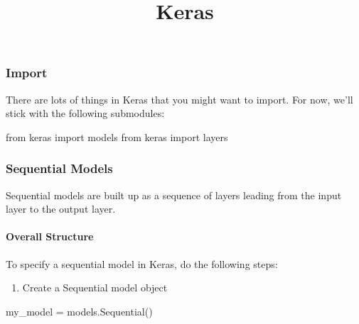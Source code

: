 \documentclass[]{extarticle}
\title{Keras}
\author{}
\date{}
\newenvironment{Shaded}{\begin{snugshade}}{\end{snugshade}}
\newcommand{\ImportTok}[1]{\textcolor[rgb]{0.80,0.80,0.80}{#1}}
\newcommand{\NormalTok}[1]{\textcolor[rgb]{0.80,0.80,0.80}{#1}}
\newcommand{\OperatorTok}[1]{\textcolor[rgb]{0.94,0.94,0.82}{#1}}
\providecommand{\tightlist}{%
  \setlength{\itemsep}{0pt}\setlength{\parskip}{0pt}}
\let\oldparagraph\paragraph
\renewcommand{\paragraph}[1]{\oldparagraph{#1}\mbox{}}
\begin{document}
\maketitle

\hypertarget{import}{%
\subsubsection{Import}\label{import}}

There are lots of things in Keras that you might want to import. For
now, we'll stick with the following submodules:

\begin{Shaded}
\begin{Highlighting}[]
\ImportTok{from}\NormalTok{ keras }\ImportTok{import}\NormalTok{ models}
\ImportTok{from}\NormalTok{ keras }\ImportTok{import}\NormalTok{ layers}
\end{Highlighting}
\end{Shaded}

\hypertarget{sequential-models}{%
\subsubsection{Sequential Models}\label{sequential-models}}

Sequential models are built up as a sequence of layers leading from the
input layer to the output layer.

\hypertarget{overall-structure}{%
\paragraph{Overall Structure}\label{overall-structure}}

To specify a sequential model in Keras, do the following steps:

\begin{enumerate}
\def\labelenumi{\arabic{enumi}.}
\tightlist
\item
  Create a Sequential model object
\end{enumerate}

\begin{Shaded}
\begin{Highlighting}[]
\NormalTok{my_model }\OperatorTok{=}\NormalTok{ models.Sequential()}
\end{Highlighting}
\end{Shaded}
\end{document}
